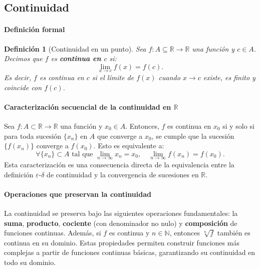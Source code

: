 \documentclass[12pt, a4paper]{article}
\theoremstyle{rioplatense}
\newtheorem{definicion}{Definición}[section]
\begin{document}
\newpage

\subsection{Continuidad}
\paragraph{Definición formal}
\begin{definicion}[Continuidad en un punto]
    Sea $f: A \subseteq \mathbb{R} \to \mathbb{R}$ una función y $c \in A$. Decimos que $f$ es \textbf{continua en $c$} si:
    $$
    \lim_{x \to c} f(x) = f(c).
    $$
    Es decir, $f$ es continua en $c$ si el límite de $f(x)$ cuando $x \to c$ existe, es finito y coincide con $f(c)$.
\end{definicion}

\paragraph{Caracterización secuencial de la continuidad en \(\mathbb{R}\)}
Sea \(f: A \subset \mathbb{R} \to \mathbb{R}\) una función y \(x_0 \in A\). Entonces, \(f\) es continua en \(x_0\) si y solo si para toda sucesión \(\{x_n\}\) en \(A\) que converge a \(x_0\), se cumple que la sucesión \(\{f(x_n)\}\) converge a \(f(x_0)\). Esto es equivalente a:
\[
\forall \{x_n\} \subset A \text{ tal que } \lim_{n \to \infty} x_n = x_0, \quad \lim_{n \to \infty} f(x_n) = f(x_0).
\]
Esta caracterización es una consecuencia directa de la equivalencia entre la definición \(\varepsilon\)-\(\delta\) de continuidad y la convergencia de sucesiones en \(\mathbb{R}\).

\paragraph{Operaciones que preservan la continuidad}
La continuidad se preserva bajo las siguientes operaciones fundamentales: la \textbf{suma}, \textbf{producto}, \textbf{cociente} (con denominador no nulo) y \textbf{composición} de funciones continuas. Además, si \(f\) es continua y \(n \in \mathbb{N}\), entonces \(\sqrt[n]{f}\) también es continua en su dominio. Estas propiedades permiten construir funciones más complejas a partir de funciones continuas básicas, garantizando su continuidad en todo su dominio.
\end{document}
